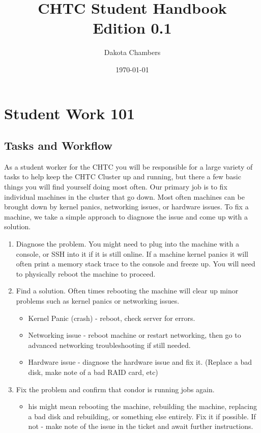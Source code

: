 \documentclass[10pt,letterpaper]{article}
\begin{document}
\title{CHTC Student Handbook \\
    \large Edition 0.1}
\author{Dakota Chambers}
\date{\today}
\maketitle

\tableofcontents
\clearpage

\section{Student Work 101}
    \subsection{Tasks and Workflow}
        As a student worker for the CHTC you will be responsible for a large variety
        of tasks to help keep the CHTC Cluster up and running, but there a few basic
        things you will find yourself doing most often. Our primary job is to fix
        individual machines in the cluster that go down. Most often machines can
        be brought down by kernel panics, networking issues, or hardware issues.
        To fix a machine, we take a simple approach to diagnose the issue and come
        up with a solution.

        \begin{enumerate}
            \item Diagnose the problem. You might need to plug into the machine
            with a console, or SSH into it if it is still online. If a machine
            kernel panics it will often print a memory stack trace to the console
            and freeze up. You will need to physically reboot the machine to proceed.
            \item Find a solution. Often times rebooting the machine will clear up
            minor problems such as kernel panics or networking issues.
            \begin{itemize}
                \item Kernel Panic (crash) - reboot, check server for errors.
                \item Networking issue - reboot machine or restart networking, then
                go to advanced networking troubleshooting if still needed.
                \item Hardware issue - diagnose the hardware issue and fix it.
                (Replace a bad disk, make note of a bad RAID card, etc)
            \end{itemize}
            \item Fix the problem and confirm that condor is running jobs again.
            \begin{itemize}
                \item his might mean rebooting the machine, rebuilding the machine,
                replacing a bad disk and rebuilding, or something else entirely.
                Fix it if possible. If not - make note of the issue in the ticket
                and await further instructions.
            \end{itemize}
        \end{enumerate}
\end{document}
